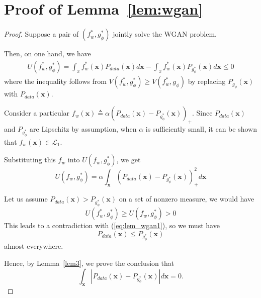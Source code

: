 \section{Proof of Lemma~\ref{lem:wgan}}\label{appendixC}
\begin{proof}
Suppose a pair of $(f_w^*, g_\phi^*)$ jointly solve the WGAN problem.

Then, on one hand, we have
\begin{align}\label{eq:lem_wgan1}
U(f_w^*,g_\phi^*)=\int_x f_w^*(\mathbf x) P_{data}(\mathbf x)d\mathbf x - \int_x f_w^* (\mathbf x)P_{g_\phi^*}(\mathbf x)d\mathbf x\leq 0
\end{align}
where the inequality follows from $V(f_w^*,g_\phi^*)\geq V(f_w^*,g_\phi)$ by replacing $P_{g_\phi}(\mathbf x)$ with $P_{data}(\mathbf x)$.

Consider a particular $f_w(\mathbf x)\triangleq \alpha(P_{data}(\mathbf x)-P_{g_\phi^*}(\mathbf x))_+$.  Since $P_{data}(\mathbf x)$ and $P_{g_\phi^*}$ are Lipschitz by assumption, when $\alpha$ is sufficiently small, it can be shown that $f_w(\mathbf x)\in\mathcal L_1$.

Substituting this $f_w$ into $U(f_w, g_\phi^*)$, we get
$$
U(f_w,g_\phi^*)=\alpha \int_\mathbf x (P_{data}(\mathbf x)-P_{g_\phi^*}(\mathbf x))_+^2 d\mathbf x
$$

Let us assume $P_{data}(\mathbf x) > P_{g_\phi^*}(\mathbf x)$ on a set of nonzero measure, we would have
$$
U(f_w^*,g_\phi^*)\geq U(f_w,g_\phi^*) > 0
$$
This leads to a contradiction with (\ref{eq:lem_wgan1}), so we must have
$$
P_{data}(\mathbf x) \leq P_{g_\phi^*}(\mathbf x)
$$
almost everywhere.

Hence, by Lemma~\ref{lem3}, we prove the conclusion that
$$
\int_{\mathbf x}|P_{data}(\mathbf x)-P_{g_\phi^*}(\mathbf x)|d\mathbf x=0.
$$
\end{proof}

